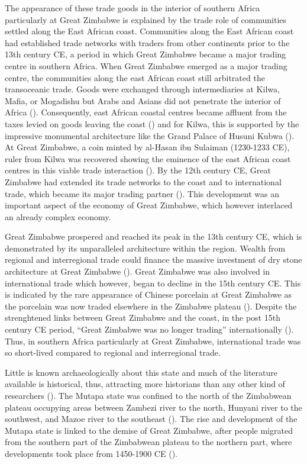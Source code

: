 The appearance of these trade goods in the interior of southern Africa particularly at Great Zimbabwe is explained by the trade role of  communities settled along the East African coast. Communities along the East African coast had established trade networks with traders from other continents prior to the 13th century CE, a period in which Great Zimbabwe became a major trading centre in southern Africa. When Great Zimbabwe emerged as a major trading centre, the communities along the east African coast still arbitrated the transoceanic trade. Goods were exchanged through intermediaries at Kilwa, Mafia, or Mogadishu but Arabs and Asians did not penetrate the interior of Africa (\cite[][]{alradi1990}). Consequently, east African coastal centres became affluent from the taxes levied on goods leaving the coast (\cite[][]{alradi1990}) and for Kilwa, this is supported by the impressive monumental architecture like the Grand Palace of Husuni Kubwa (\cite[][]{pikirayi2006}). At Great Zimbabwe, a coin minted by al-Hasan ibn Sulaiman (1230-1233 CE), ruler from Kilwa was recovered showing the eminence of the east African coast centres in this viable trade interaction (\cite[][]{pikirayi2006}). By the 12th century CE, Great Zimbabwe had extended its trade networks to the coast and to international trade, which became its major trading partner (\cites[][]{pwiti2005}[][]{kusimba2007}[][]{kim2008}). This development was an important aspect of the economy of Great Zimbabwe, which however interlaced an already complex economy.

Great Zimbabwe prospered and reached its peak in the 13th century CE, which is demonstrated by its unparalleled architecture within the region. Wealth from regional and interregional trade could finance the massive investment of dry stone architecture at Great Zimbabwe (\cite[][]{kim2008}). Great Zimbabwe was also involved in international trade which however, began to decline in the 15th century CE. This is indicated by the rare appearance of Chinese porcelain at Great Zimbabwe as the porcelain was now traded elsewhere in the Zimbabwe plateau (\cite[][]{pikirayi2006}). Despite the strenghtened links between Great Zimbabwe and the coast, in the post 15th century CE period, “Great Zimbabwe was no longer trading” internationally (\cite[][135]{garlake1973}). Thus, in southern Africa particularly at Great Zimbabwe, international trade was so short-lived compared to regional and interregional trade.


Little is known archaeologically about this state and much of the literature available is historical, thus, attracting more historians than any other kind of researchers (\cite[][]{pikirayi1993}). The Mutapa state was confined to the north of the Zimbabwean plateau occupying areas between Zambezi river to the north, Hunyani river to the southwest, and Mazoe river to the southeast (\cite[][1]{beach1976}). The rise and development of the Mutapa state is linked to the demise of Great Zimbabwe, after people migrated from the southern part of the Zimbabwean plateau to the northern part, where developments took place from 1450-1900 CE (\cite[][]{pikirayi2006}).

